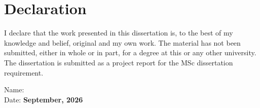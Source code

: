 \section*{\centering Declaration}
\vspace{24pt}
I declare that the work presented in this dissertation is, to the best of my knowledge and belief, original and my own work. The material has not been submitted, either in whole or in part, for a degree at this or any other university. The dissertation is submitted as a project report for the MSc dissertation requirement.

\vspace{24pt}
\noindent Name: \textbf{\authorname}\\
\noindent Date: \textbf{September, 2026}
